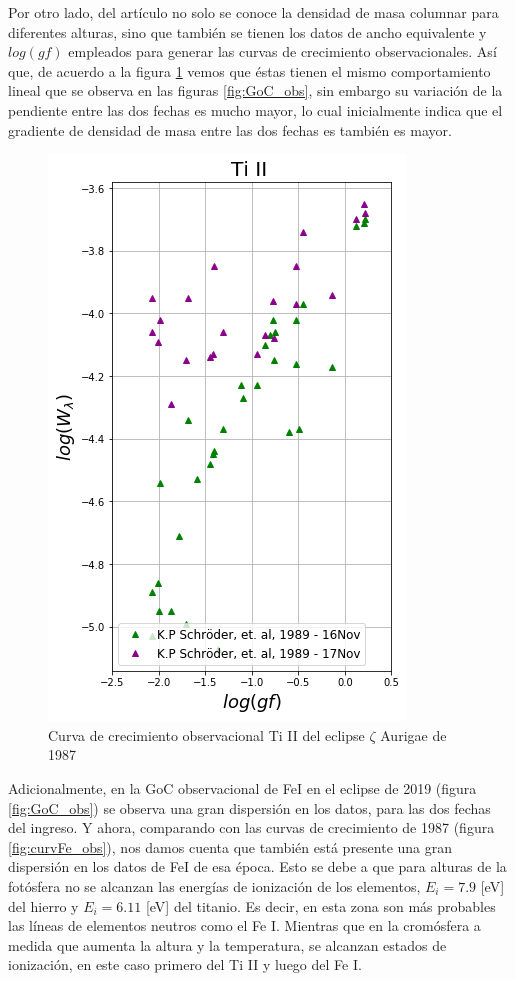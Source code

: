 \documentclass[12pt,oneside,openany,letter]{book}
\begin{document}
Por otro lado, del artículo \cite{kps1O} no solo se conoce la densidad de masa columnar para diferentes alturas, sino que también se tienen los datos de ancho equivalente y $log(gf)$ empleados para generar las curvas de crecimiento observacionales. Así que, de acuerdo a la figura \ref{fig:Ti2Klaus} vemos que éstas tienen el mismo comportamiento lineal que se observa en las figuras \ref{fig:GoC_obs}, sin embargo su variación de la pendiente entre las dos fechas es mucho mayor, lo cual inicialmente indica que el gradiente de densidad de masa entre las dos fechas es también es mayor.

\begin{figure}[h]
    \centering
    \includegraphics[width=0.5\linewidth]{Gaficas/Ti2Klaus.png}
    \caption{Curva de crecimiento observacional Ti II del eclipse $\zeta$ Aurigae de 1987}
    \label{fig:Ti2Klaus}
\end{figure}

Adicionalmente, en la GoC observacional de FeI en el eclipse de 2019 (figura \ref{fig:GoC_obs}) se observa una gran dispersión en los datos, para las dos fechas del ingreso. Y ahora, comparando con las curvas de crecimiento de 1987 (figura \ref{fig:curvFe_obs}), nos damos cuenta que también está presente una gran dispersión en los datos de FeI de esa época. Esto se debe a que para alturas de la fotósfera no se alcanzan las energías de ionización de los elementos, $E_i = 7.9$ [eV] del hierro y $E_i = 6.11$ [eV] del titanio. Es decir, en esta zona son más probables las líneas de elementos neutros como el Fe I. Mientras que en la cromósfera a medida que aumenta la altura y la temperatura, se alcanzan estados de ionización, en este caso primero del Ti II y luego del Fe I.
\end{document}
